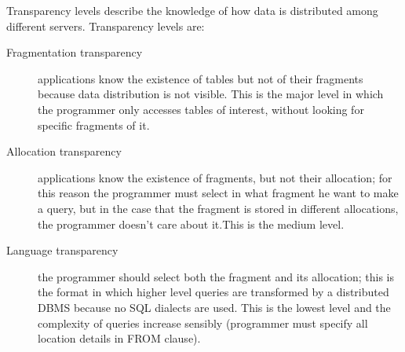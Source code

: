 Transparency levels describe the knowledge of how data is distributed among different servers.
Transparency levels are:
\begin{description}
	\item[Fragmentation transparency] applications know the existence of tables but not of their fragments because data distribution is not visible.
	This is the major level in which the programmer only accesses tables of interest, without looking for specific fragments of it.
	\item[Allocation transparency] applications know the existence of fragments, but not their allocation; for this reason the programmer must select in what fragment he want to make a query, but in the case that the fragment is 
	stored in different allocations, the programmer doesn't care about it.This is the medium level.
	\item[Language transparency] the programmer should select both the fragment and its allocation; this is the format in which higher level queries are transformed by a distributed DBMS because no SQL dialects are used.
	This is the lowest level and the complexity of queries increase sensibly (programmer must specify all location details in FROM clause).
\end{description}

